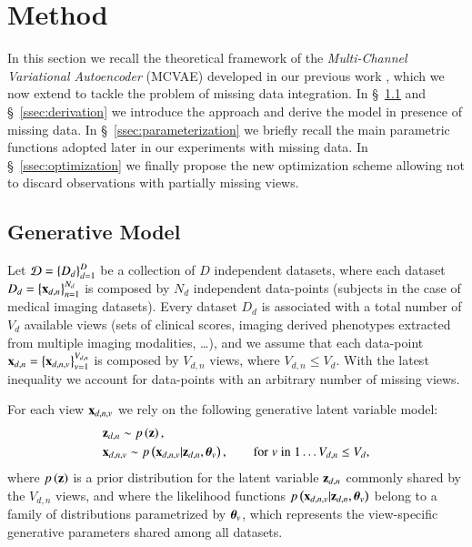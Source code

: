 \section{Method}
\label{sec:method}

In this section we recall the theoretical framework of the \textit{Multi-Channel Variational Autoencoder} (MCVAE) developed in our previous work \citep{Antelmi2019}, which we now extend to tackle the problem of missing data integration.
In \S~\ref{ssec:generative_model} and \S~\ref{ssec:derivation} we introduce the approach and derive the model in presence of missing data.
In \S~\ref{ssec:parameterization} we briefly recall the main parametric functions adopted later in our experiments with missing data.
In \S~\ref{ssec:optimization} we finally propose the new optimization scheme allowing not to discard observations with partially missing views.

\subsection{Generative Model}
\label{ssec:generative_model}

Let $\mathcal{D} = \left\{D_d\right\}_{d=1}^D$ be a collection of $D$ independent datasets, where each dataset $D_d = \left\{\mathbf{x}_{d,n}\right\}_{n=1}^{N_d}$ is composed by $N_d$ independent data-points (\eg subjects in the case of medical imaging datasets).
Every dataset $D_d$ is associated with a total number of $V_d$ available views
(\eg sets of clinical scores, imaging derived phenotypes extracted from multiple imaging modalities, \ldots),
and we assume that each data-point $\mathbf{x}_{d,n} = \left\{\mathbf{x}_{d,n,v}\right\}_{v=1}^{V_{d,n}}$ is composed by $V_{d,n}$ views,
where $V_{d,n} \leq V_d$.
With the latest inequality we account for data-points with an arbitrary number of missing views.

For each view $\mathbf{x}_{d,n,v}$ we rely on the following generative latent variable model:
\begin{equation}\label{eq:model}
\begin{aligned}
&\z_{d,n} \sim \p{\z}, \\  %
&\xdnv \sim \p{\xdnv|\z_{d,n},\thetab_v},  %
\qquad \textnormal {for} \; v \; \textnormal{in} \; 1 \ldots V_{d,n} \leq V_d,
\end{aligned}
\end{equation}
where $p\left(\mathbf{z}\right)$ is a prior distribution for the latent variable $\mathbf{z}_{d,n}$ commonly shared by the $V_{d,n}$ views, and
where the likelihood functions $p\left(\mathbf{x}_{d,n,v}|\mathbf{z}_{d,n},\boldsymbol{\theta}_v\right)$ belong to a family of distributions parametrized by $\boldsymbol{\theta}_v$, which represents the view-specific generative parameters shared among all datasets.

